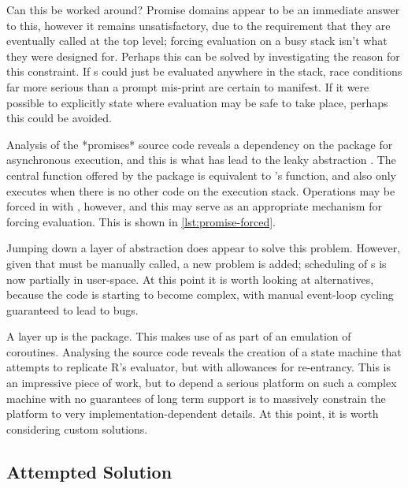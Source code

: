 
Can this be worked around?
Promise domains appear to be an immediate answer to this, however it remains unsatisfactory, due to the requirement that they are eventually called at the top level; forcing evaluation on a busy stack isn't what they were designed for.
Perhaps this can be solved by investigating the reason for this constraint.
If s could just be evaluated anywhere in the stack, race conditions far more serious than a prompt mis-print are certain to manifest.
If it were possible to explicitly state where evaluation may be safe to take place, perhaps this could be avoided.

Analysis of the *promises* source code reveals a dependency on the  package for asynchronous execution, and this is what has lead to the leaky abstraction \cite{chang2021later}.
The central  function offered by the package is equivalent to 's  function, and also only executes when there is no other \R{} code on the execution stack.
Operations may be forced in  with , however, and this may serve as an appropriate mechanism for forcing evaluation.
This is shown in \cref{lst:promise-forced}.


Jumping down a layer of abstraction does appear to solve this problem.
However, given that  must be manually called, a new problem is added; scheduling of s is now partially in user-space.
At this point it is worth looking at alternatives, because the code is starting to become complex, with manual event-loop cycling guaranteed to lead to bugs.

A layer up is the  package\cite{henry21coro}.
This makes use of  as part of an emulation of coroutines.
Analysing the source code reveals the creation of a state machine that attempts to replicate R's evaluator, but with allowances for re-entrancy.
This is an impressive piece of work, but to depend a serious platform on such a complex machine with no guarantees of long term support is to massively constrain the platform to very implementation-dependent details.
At this point, it is worth considering custom solutions.

\subsection{Attempted Solution}

